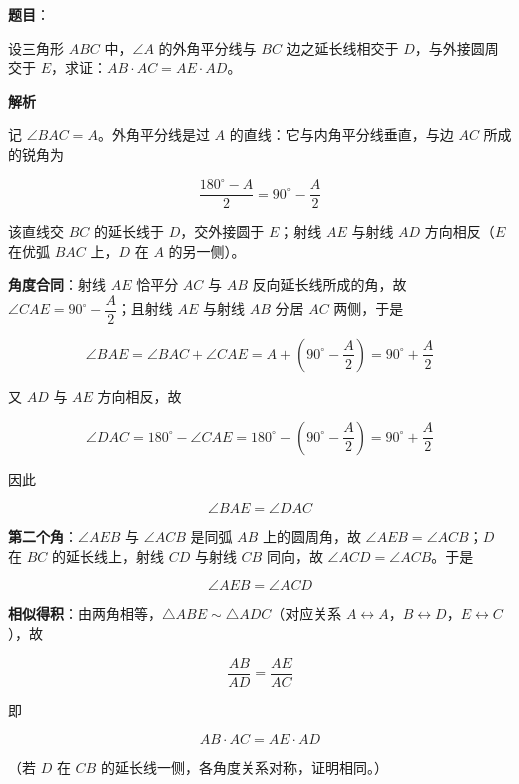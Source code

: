 \begin{answer}

\textbf{题目}：

设三角形 $ABC$ 中，$\angle A$ 的外角平分线与 $BC$ 边之延长线相交于 $D$，与外接圆周交于 $E$，求证：$AB\cdot AC=AE\cdot AD$。

\textbf{解析}

记 $\angle BAC=A$。外角平分线是过 $A$ 的直线：它与内角平分线垂直，与边 $AC$ 所成的锐角为

\nopagebreak[4]
\[
\frac{180^\circ-A}{2}=90^\circ-\frac A2
\]

该直线交 $BC$ 的延长线于 $D$，交外接圆于 $E$；射线 $AE$ 与射线 $AD$ 方向相反（$E$ 在优弧 $BAC$ 上，$D$ 在 $A$ 的另一侧）。

\textbf{角度合同}：射线 $AE$ 恰平分 $AC$ 与 $AB$ 反向延长线所成的角，故 $\angle CAE=90^\circ-\dfrac A2$；且射线 $AE$ 与射线 $AB$ 分居 $AC$ 两侧，于是

\nopagebreak[4]
\[
\angle BAE=\angle BAC+\angle CAE=A+\left(90^\circ-\frac A2\right)=90^\circ+\frac A2
\]

又 $AD$ 与 $AE$ 方向相反，故

\nopagebreak[4]
\[
\angle DAC=180^\circ-\angle CAE=180^\circ-\left(90^\circ-\frac A2\right)=90^\circ+\frac A2
\]

因此

\nopagebreak[4]
\[
\angle BAE=\angle DAC
\]

\textbf{第二个角}：$\angle AEB$ 与 $\angle ACB$ 是同弧 $AB$ 上的圆周角，故 $\angle AEB=\angle ACB$；$D$ 在 $BC$ 的延长线上，射线 $CD$ 与射线 $CB$ 同向，故 $\angle ACD=\angle ACB$。于是

\nopagebreak[4]
\[
\angle AEB=\angle ACD
\]

\textbf{相似得积}：由两角相等，$\triangle ABE\sim\triangle ADC$（对应关系 $A\leftrightarrow A$，$B\leftrightarrow D$，$E\leftrightarrow C$），故

\nopagebreak[4]
\[
\frac{AB}{AD}=\frac{AE}{AC}
\]

即

\nopagebreak[4]
\[
AB\cdot AC=AE\cdot AD
\]

（若 $D$ 在 $CB$ 的延长线一侧，各角度关系对称，证明相同。）


\end{answer}
